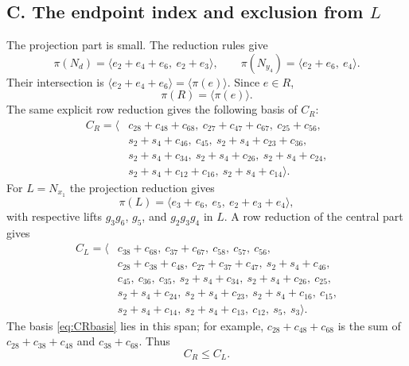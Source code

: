 \documentclass[journal]{IEEEtran}
\begin{document}
\subsection*{C. The endpoint index and exclusion from $L$}
The projection part is small.  The reduction rules give
\[
 \pi(N_d)=\langle e_2+e_4+e_6,\ e_2+e_3\rangle,
 \qquad
 \pi(N_{y_4})=\langle e_2+e_6,\ e_4\rangle.
\]
Their intersection is
$\langle e_2+e_4+e_6\rangle=\langle\pi(e)\rangle$.  Since $e\in R$,
\begin{equation}\label{eq:Rprojection}
 \pi(R)=\langle\pi(e)\rangle.
\end{equation}
The same explicit row reduction gives the following basis of $C_R$:
\begin{align}
C_R=\langle{}&c_{28}+c_{48}+c_{68},\ c_{27}+c_{47}+c_{67},\ c_{25}+c_{56},
\nonumber\\
&s_2+s_4+c_{46},\ c_{45},\ s_2+s_4+c_{23}+c_{36},
\nonumber\\
&s_2+s_4+c_{34},\ s_2+s_4+c_{26},\ s_2+s_4+c_{24},
\nonumber\\
&s_2+s_4+c_{12}+c_{16},\ s_2+s_4+c_{14}\rangle.\label{eq:CRbasis}
\end{align}
For $L=N_{x_1}$ the projection reduction gives
\begin{equation}\label{eq:Lprojection}
 \pi(L)=\langle e_3+e_6,\ e_5,\ e_2+e_3+e_4\rangle,
\end{equation}
with respective lifts $g_3g_6$, $g_5$, and $g_2g_3g_4$ in $L$.  A row
reduction of the central part gives
\begin{align*}
C_L=\langle{}&c_{38}+c_{68},\ c_{37}+c_{67},\ c_{58},\ c_{57},\ c_{56},\\
&c_{28}+c_{38}+c_{48},\ c_{27}+c_{37}+c_{47},\ s_2+s_4+c_{46},\\
&c_{45},\ c_{36},\ c_{35},\ s_2+s_4+c_{34},\ s_2+s_4+c_{26},\ c_{25},\\
&s_2+s_4+c_{24},\ s_2+s_4+c_{23},\ s_2+s_4+c_{16},\ c_{15},\\
&s_2+s_4+c_{14},\ s_2+s_4+c_{13},\ c_{12},\ s_5,\ s_3\rangle.
\end{align*}
The basis \eqref{eq:CRbasis} lies in this span; for example,
$c_{28}+c_{48}+c_{68}$ is the sum of
$c_{28}+c_{38}+c_{48}$ and $c_{38}+c_{68}$.  Thus
\begin{equation}\label{eq:CRinL}
 C_R\le C_L.
\end{equation}
\end{document}
